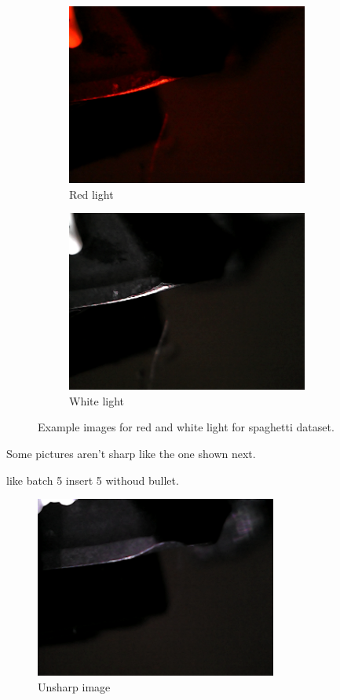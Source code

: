 \begin{figure}[hbtp]
	\centering
	\begin{subfigure}{0.49\textwidth}
		\includegraphics[width=3.125000in, keepaspectratio=true]{./fig/Vision/Dataset/automated_datasets/2_created_datasets/2_Spaghetti_dataset/b_003_p_006_l_006-011_red_nb.png}
		\caption{Red light}
	\end{subfigure}
	\hspace*{\fill}
	\begin{subfigure}{0.49\textwidth}
		\includegraphics[width=3.125000in, keepaspectratio=true]{./fig/Vision/Dataset/automated_datasets/2_created_datasets/2_Spaghetti_dataset/b_003_p_006_l_006-011_white_nb.png}
		\caption{White light}
	\end{subfigure}
	\caption{Example images for red and white light for spaghetti dataset.}
\end{figure}



Some pictures aren't sharp like the one shown next.

like batch 5 insert 5 withoud bullet.
\begin{figure}[hbtp]
	\centering
	\includegraphics[width=3.125000in, keepaspectratio=true]{./fig/Vision/Dataset/automated_datasets/2_created_datasets/2_Spaghetti_dataset/b_005_p_005_l_006-011_white_nb.png}
	\caption{Unsharp image}
\end{figure}



